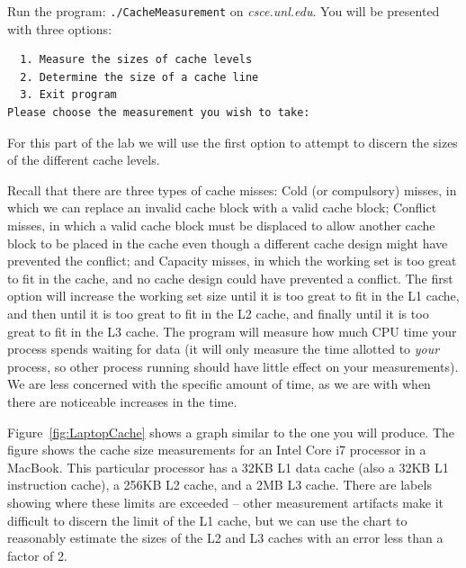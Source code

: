 Run the program: \texttt{./CacheMeasurement} on \textit{csce.unl.edu}. You will
be presented with three options:

\begin{verbatim}
  1. Measure the sizes of cache levels
  2. Determine the size of a cache line
  3. Exit program
Please choose the measurement you wish to take:
\end{verbatim}

For this part of the lab we will use the first option to attempt to discern the
sizes of the different cache levels.

Recall that there are three types of cache misses: Cold (or compulsory) misses,
in which we can replace an invalid cache block with a valid cache block;
Conflict misses, in which a valid cache block must be displaced to allow
another cache block to be placed in the cache even though a different cache
design might have prevented the conflict; and Capacity misses, in which the
working set is too great to fit in the cache, and no cache design could have
prevented a conflict. The first option will increase the working set size until
it is too great to fit in the L1 cache, and then until it is too great to fit
in the L2 cache, and finally until it is too great to fit in the L3 cache. The
program will measure how much CPU time your process spends waiting for data (it
will only measure the time allotted to \textit{your} process, so other process
running should have little effect on your measurements). We are less concerned
with the specific amount of time, as we are with when there are noticeable
increases in the time.

Figure~\ref{fig:LaptopCache} shows a graph similar to the one you will
produce. The figure shows the cache size measurements for an Intel Core i7
processor in a MacBook. This particular processor has a 32KB L1 data cache
(also a 32KB L1 instruction cache), a 256KB L2 cache, and a 2MB L3 cache. There
are labels showing where these limits are exceeded -- other measurement
artifacts make it difficult to discern the limit of the L1 cache, but we can
use the chart to reasonably estimate the sizes of the L2 and L3 caches with an
error less than a factor of 2.

